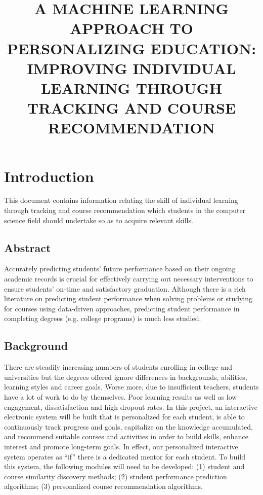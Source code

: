 \documentclass{article}
\begin{document}
\title{A MACHINE LEARNING APPROACH TO PERSONALIZING EDUCATION: IMPROVING INDIVIDUAL LEARNING THROUGH TRACKING AND COURSE RECOMMENDATION}
\author{}
\maketitle

\section{Introduction}
This document contains information relating the skill of individual learning through tracking and course recommendation which students in the computer science field should undertake so as to acquire relevant skills.
\subsection{Abstract}
Accurately predicting students’ future performance based on their ongoing academic records is crucial for effectively carrying out necessary interventions to ensure students’
on-time and satisfactory graduation. Although there is a rich literature on predicting student performance when solving problems or studying for courses using data-driven approaches,
predicting student performance in completing degrees (e.g. college programs) is much less studied.

\subsection{Background}
There are steadily increasing numbers of students enrolling in college and universities but the degrees offered ignore differences in backgrounds, abilities, learning styles and career goals. Worse more, due to insufficient teachers, students have a lot of work to  do by themselves. Poor learning results as well as low engagement, dissatisfaction and high dropout rates. In this project, an interactive electronic system will be built that is personalized for each student, is able to continuously track progress and goals, capitalize on the knowledge accumulated, and recommend suitable courses and activities in order to build skills, enhance interest and promote  long-term goals. In effect, our personalized interactive system operates as “if” there is a dedicated mentor for each student. To build this system, the following modules will need to be developed: (1) student and course similarity discovery methods; (2) student performance prediction algorithms; (3) personalized course recommendation algorithms.
\end{document}
